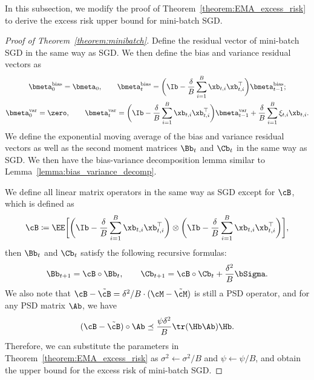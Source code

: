 \documentclass[11pt]{article}
\begin{document}
In this subsection, we modify the proof of Theorem~\ref{theorem:EMA_excess_risk} to derive the excess risk upper bound for mini-batch SGD.
\begin{proof}[Proof of Theorem~\ref{theorem:minibatch}]
Define the residual vector of mini-batch SGD in the same way as SGD. We then define the bias and variance residual vectors as
\begin{gather*}
\bmeta_0^{\mathrm{bias}}=\bmeta_0,\qquad\bmeta_t^{\mathrm{bias}}=\bigg(\Ib-\frac\delta B\sum_{i=1}^B\xb_{t, i}\xb_{t, i}^\top\bigg)\bmeta_{t-1}^{\mathrm{bias}};\\
\bmeta_0^{\mathrm{var}}=\zero,\qquad\bmeta_t^{\mathrm{var}}=\bigg(\Ib-\frac\delta B\sum_{i=1}^B\xb_{t, i}\xb_{t, i}^\top\bigg)\bmeta_{t-1}^{\mathrm{var}}+\frac\delta B\sum_{i=1}^B\xi_{t, i}\xb_{t, i}.
\end{gather*}
We define the exponential moving average of the bias and variance residual vectors as well as the second moment matrices $\Bb_t$ and $\Cb_t$ in the same way as SGD. We then have the bias-variance decomposition lemma similar to Lemma~\ref{lemma:bias_variance_decomp}.

We define all linear matrix operators in the same way as SGD except for $\cB$, which is defined as
\begin{align*}
\cB\coloneqq\EE\bigg[\bigg(\Ib-\frac\delta B\sum_{i=1}^B\xb_{t, i}\xb_{t, i}^\top\bigg)\otimes\bigg(\Ib-\frac\delta B\sum_{i=1}^B\xb_{t, i}\xb_{t, i}^\top\bigg)\bigg],
\end{align*}
then $\Bb_t$ and $\Cb_t$ satisfy the following recursive formulas:
\begin{align*}
\Bb_{t+1}=\cB\circ\Bb_t,\qquad\Cb_{t+1}=\cB\circ\Cb_t+\frac{\delta^2}{B}\bSigma.
\end{align*}
We also note that $\cB-\tilde\cB=\delta^2/B\cdot(\cM-\tilde\cM)$ is still a PSD operator, and for any PSD matrix $\Ab$, we have
\begin{align*}
(\cB-\tilde\cB)\circ\Ab\preceq\frac{\psi\delta^2}{B}\tr(\Hb\Ab)\Hb.
\end{align*}
Therefore, we can substitute the parameters in Theorem~\ref{theorem:EMA_excess_risk} as $\sigma^2\gets\sigma^2/B$ and $\psi\gets\psi/B$, and obtain the upper bound for the excess risk of mini-batch SGD.
\end{proof}
\end{document}
